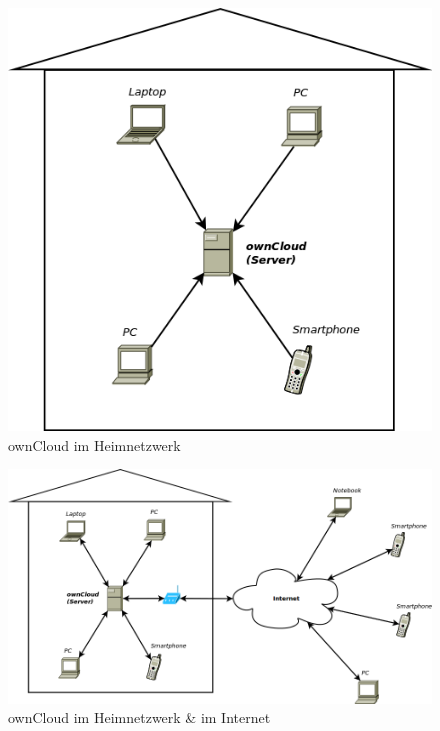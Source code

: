 \begin{figure}[H]
\centering
\includegraphics[scale=0.55]{images/owncloud_homenetwork}
\caption{ownCloud im Heimnetzwerk}
\end{figure}

\begin{figure}[H]
\centering
\includegraphics[scale=0.5]{images/owncloud_widenetwork}
\caption{ownCloud im Heimnetzwerk \& im Internet}
\end{figure}

